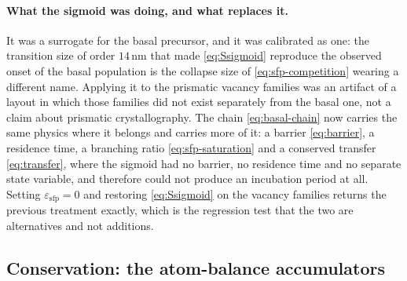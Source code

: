\documentclass{article}
\begin{document}
\paragraph{What the sigmoid was doing, and what replaces it.} It was a surrogate
for the basal precursor, and it was calibrated as one: the transition size of
order $14\,$nm that made \cref{eq:Ssigmoid} reproduce the observed onset of the
basal population \citep{spatialCD2024} is the collapse size of
\cref{eq:sfp-competition} wearing a different name. Applying it to the prismatic
vacancy families was an artifact of a layout in which those families did not
exist separately from the basal one, not a claim about prismatic
crystallography. The chain \cref{eq:basal-chain} now carries the same physics
where it belongs and carries more of it: a barrier \cref{eq:barrier}, a residence
time, a branching ratio \cref{eq:sfp-saturation} and a conserved transfer
\cref{eq:transfer}, where the sigmoid had no barrier, no residence time and no
separate state variable, and therefore could not produce an incubation period at
all. Setting $\varepsilon_{\mathrm{sfp}}=0$ and restoring \cref{eq:Ssigmoid} on
the vacancy families returns the previous treatment exactly, which is the
regression test that the two are alternatives and not additions.

\subsection{Conservation: the atom-balance accumulators}
\label{sec:observables}
\end{document}
